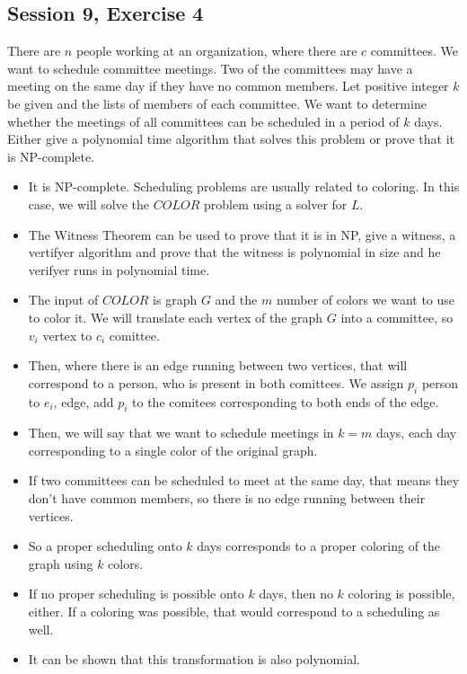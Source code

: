 \subsection {Session 9, Exercise 4}


There are $n$ people working at an organization, where there are $c$ committees. We want to schedule committee
meetings. Two of the committees may have a meeting on the same day if they have no common members.
Let positive integer $k$ be given and the lists of members of each committee. We want to determine whether the
meetings of all committees can be scheduled in a period of $k$ days. Either give a polynomial time algorithm
that solves this problem or prove that it is NP-complete.


\begin{itemize}
    \item It is NP-complete. Scheduling problems are usually related to coloring. In this case, we will solve the $COLOR$ problem using a solver for $L$.
    \item The Witness Theorem can be used to prove that it is in NP, give a witness, a vertifyer algorithm and prove that the witness is polynomial in size and he verifyer runs in polynomial time.
    \item The input of $COLOR$ is graph $G$ and the $m$ number of colors we want to use to color it. We will translate each vertex of the graph $G$ into a committee, so $v_i$ vertex to $c_i$ comittee.
    \item Then, where there is an edge running between two vertices, that will correspond to a person, who is present in both comittees. We assign $p_i$ person to $e_i$, edge, add $p_i$ to the comitees corresponding to both ends of the edge.
    \item Then, we will say that we want to schedule meetings in $k=m$ days, each day corresponding to a single color of the original graph.
    \item If two committees can be scheduled to meet at the same day, that means they don't have common members, so there is no edge running between their vertices.
    \item So a proper scheduling onto $k$ days corresponds to a proper coloring of the graph using $k$ colors.
    \item If no proper scheduling is possible onto $k$ days, then no $k$ coloring is possible, either. If a coloring was possible, that would correspond to a scheduling as well.
    \item It can be shown that this transformation is also polynomial.
\end{itemize}

